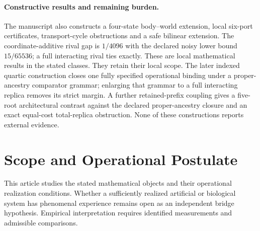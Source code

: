 \documentclass[11pt,a4paper]{article}
\theoremstyle{definition}
\begin{document}
\begin{abstract}
The paper also organizes the operational realization of the bridge program into ordered architectural requirements (formal specification through final admissibility review). The formal specification and provisional readout construction capture the existing structural specification and provisional run-level estimator layer whose evidential authority remains strictly bounded by local provenance and non-claim rules. The intervention and remaining realization requirements remain open research and engineering burdens: bridge interventions (intervention specification), bridge comparators (comparator specification), calibrated threshold binding and conjunctive gate closure (calibrated gate evaluation), multi-run campaign integration (cross-experiment integration), and final bridge stack adjudication (final admissibility review). The paper is therefore both a theoretical synthesis and a formal burden architecture detailing the strongest admissible claim class available without empirical or metaphysical overreach.
\end{abstract}

\paragraph{Constructive results and remaining burden.}
The manuscript also constructs a four-state body--world extension, local six-port certificates, transport-cycle obstructions and a safe bilinear extension. The coordinate-additive rival gap is $1/4096$ with the declared noisy lower bound $15/65536$; a full interacting rival ties exactly. These are local mathematical results in the stated classes. They retain their local scope. The later indexed quartic construction closes one fully specified operational binding under a proper-ancestry comparator grammar; enlarging that grammar to a full interacting replica removes its strict margin. A further retained-prefix coupling gives a five-root architectural contrast against the declared proper-ancestry closure and an exact equal-cost total-replica obstruction. None of these constructions reports external evidence.

\section*{Scope and Operational Postulate}
This article studies the stated mathematical objects and their operational
realization conditions. Whether a sufficiently realized artificial or biological
system has phenomenal experience remains open as an independent bridge
hypothesis. Empirical interpretation requires identified measurements and
admissible comparisons.
\end{document}

